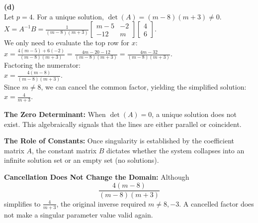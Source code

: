 \begin{solution}
\medskip
\textbf{(d)} \\
Let $p = 4$. For a unique solution, $\det(A) = (m-8)(m+3) \neq 0$. \\
$X = A^{-1}B = \frac{1}{(m-8)(m+3)} \begin{bmatrix} m-5 & -2 \\ -12 & m \end{bmatrix} \begin{bmatrix} 4 \\ 6 \end{bmatrix}$. \\
We only need to evaluate the top row for $x$: \\
$x = \frac{4(m-5) + 6(-2)}{(m-8)(m+3)} = \frac{4m - 20 - 12}{(m-8)(m+3)} = \frac{4m - 32}{(m-8)(m+3)}$. \\
Factoring the numerator: \\
$x = \frac{4(m-8)}{(m-8)(m+3)}$. \\
Since $m \neq 8$, we can cancel the common factor, yielding the simplified solution: \\
$x = \frac{4}{m+3}$.
\end{solution}

\begin{takeaways}
\item \textbf{The Zero Determinant:} When $\det(A) = 0$, a unique solution does not exist. This algebraically signals that the lines are either parallel or coincident.
\item \textbf{The Role of Constants:} Once singularity is established by the coefficient matrix $A$, the constant matrix $B$ dictates whether the system collapses into an infinite solution set or an empty set (no solutions).
\item \textbf{Cancellation Does Not Change the Domain:} Although
\[
\frac{4(m-8)}{(m-8)(m+3)}
\]
simplifies to $\frac4{m+3}$, the original inverse required $m\neq8,-3$. A cancelled factor does not make a singular parameter value valid again.
\end{takeaways}


